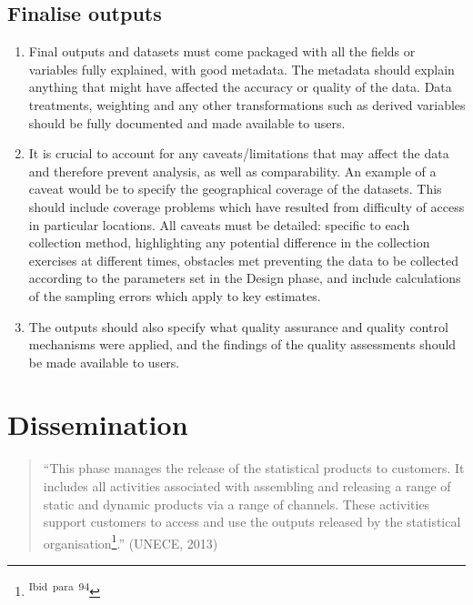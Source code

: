 \documentclass[
]{article}
\begin{document}
\hypertarget{finalise-outputs}{%
\subsection{Finalise outputs}\label{finalise-outputs}}

\begin{enumerate}
\def\labelenumi{\arabic{enumi}.}
\setcounter{enumi}{482}
\item
  Final outputs and datasets must come packaged with all the fields
  or variables fully explained, with good metadata. The metadata
  should explain anything that might have affected the accuracy or
  quality of the data. Data treatments, weighting and any other
  transformations such as derived variables should be fully documented
  and made available to users.
\item
  It is crucial to account for any caveats/limitations that may
  affect the data and therefore prevent analysis, as well as
  comparability. An example of a caveat would be to specify the
  geographical coverage of the datasets. This should include coverage
  problems which have resulted from difficulty of access in particular
  locations. All caveats must be detailed: specific to each collection
  method, highlighting any potential difference in the collection
  exercises at different times, obstacles met preventing the data to
  be collected according to the parameters set in the Design phase,
  and include calculations of the sampling errors which apply to key
  estimates.
\item
  The outputs should also specify what quality assurance and quality
  control mechanisms were applied, and the findings of the quality
  assessments should be made available to users.
\end{enumerate}

\hypertarget{dissemination}{%
\section{Dissemination}\label{dissemination}}

\begin{quote}
``This phase manages the release of the statistical products to
customers. It includes all activities associated with assembling and
releasing a range of static and dynamic products via a range of
channels. These activities support customers to access and use the
outputs released by the statistical organisation\footnote{\textsuperscript{Ibid~para~94}}.'' (UNECE, 2013)
\end{quote}
\end{document}
